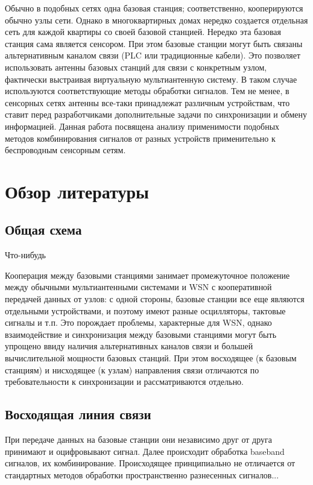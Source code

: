 \documentclass[a4paper,12pt,oneside]{scrartcl}
\begin{document}
Обычно в подобных сетях одна базовая станция; соответственно, кооперируются обычно узлы сети. Однако в многоквартирных домах нередко создается отдельная сеть для каждой квартиры со своей базовой станцией. Нередко эта базовая станция сама является сенсором. При этом базовые станции могут быть связаны альтернативным каналом связи (PLC или традиционные кабели). Это позволяет использовать антенны базовых станций для связи с конкретным узлом, фактически выстраивая виртуальную мультиантенную систему. В таком случае используются соответствующие методы обработки сигналов. Тем не менее, в сенсорных сетях антенны все-таки принадлежат различным устройствам, что ставит перед разработчиками дополнительные задачи по синхронизации и обмену информацией. Данная работа посвящена анализу применимости подобных методов комбинирования сигналов от разных устройств применительно к беспроводным сенсорным сетям.

\clearpage

\section{Обзор литературы}
\subsection{Общая схема}
Что-нибудь

Кооперация между базовыми станциями занимает промежуточное положение между обычными мультиантенными системами и WSN с кооперативной передачей данных от узлов: с одной стороны, базовые станции все еще являются отдельными устройствами, и поэтому имеют разные осцилляторы, тактовые сигналы и т.п. Это порождает проблемы, характерные для WSN, однако взаимодействие и синхронизация между базовыми станциями могут быть упрощено ввиду наличия альтернативных каналов связи и большей вычислительной мощности базовых станций. При этом восходящее (к базовым станциям) и нисходящее (к узлам) направления связи отличаются по требовательности к синхронизации и рассматриваются отдельно.

\subsection{Восходящая линия связи}

При передаче данных на базовые станции они независимо друг от друга принимают и оцифровывают сигнал. Далее происходит обработка \Large baseband \normalsize сигналов, их комбинирование. Происходящее принципиально не отличается от стандартных методов обработки пространственно разнесенных сигналов...
\end{document}

